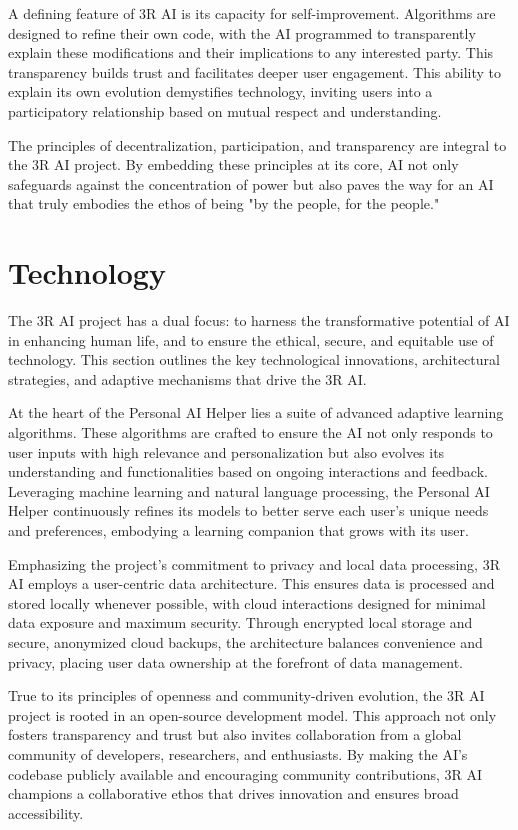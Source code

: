 \documentclass[12pt]{article}
\begin{document}
A defining feature of 3R AI is its capacity for self-improvement. Algorithms are designed to refine their own code, with the AI programmed to transparently explain these modifications and their implications to any interested party. This transparency builds trust and facilitates deeper user engagement. This ability to explain its own evolution demystifies technology, inviting users into a participatory relationship based on mutual respect and understanding.

The principles of decentralization, participation, and transparency are integral to the 3R AI project. By embedding these principles at its core, AI not only safeguards against the concentration of power but also paves the way for an AI that truly embodies the ethos of being "by the people, for the people."

\section*{Technology}

The 3R AI project has a dual focus: to harness the transformative potential of AI in enhancing human life, and to ensure the ethical, secure, and equitable use of technology. This section outlines the key technological innovations, architectural strategies, and adaptive mechanisms that drive the 3R AI.

At the heart of the Personal AI Helper lies a suite of advanced adaptive learning algorithms. These algorithms are crafted to ensure the AI not only responds to user inputs with high relevance and personalization but also evolves its understanding and functionalities based on ongoing interactions and feedback. Leveraging machine learning and natural language processing, the Personal AI Helper continuously refines its models to better serve each user's unique needs and preferences, embodying a learning companion that grows with its user.

Emphasizing the project's commitment to privacy and local data processing, 3R AI employs a user-centric data architecture. This ensures data is processed and stored locally whenever possible, with cloud interactions designed for minimal data exposure and maximum security. Through encrypted local storage and secure, anonymized cloud backups, the architecture balances convenience and privacy, placing user data ownership at the forefront of data management.

True to its principles of openness and community-driven evolution, the 3R AI project is rooted in an open-source development model. This approach not only fosters transparency and trust but also invites collaboration from a global community of developers, researchers, and enthusiasts. By making the AI's codebase publicly available and encouraging community contributions, 3R AI champions a collaborative ethos that drives innovation and ensures broad accessibility.
\end{document}
